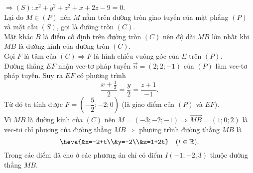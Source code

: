 \begin{ex}
{$\Rightarrow (S)\colon x^2 + y^2 + z^2 + x + 2z - 9 = 0$.\\
Lại do $M \in (P)$ nên $M$ nằm trên đường tròn giao tuyến của mặt phẳng $(P)$ và mặt cầu $(S)$, gọi là đường tròn $(C)$.\\
 Mặt khác $B$ là điểm cố định trên đường tròn $(C)$ nên độ dài $MB$ lớn nhất khi $MB$ là đường kính của đường tròn $(C)$.\\
 Gọi $F$ là tâm của $(C) \Rightarrow F$ là hình chiếu vuông góc của $E$ trên $(P)$.\\
Đường thẳng $EF$ nhận vec-tơ pháp tuyến $\overrightarrow{n} = (2; 2; -1)$ của $(P)$ làm vec-tơ pháp tuyến. Suy ra $EF$ có phương trình
$$ \dfrac{x + \frac{1}{2}}{2} = \dfrac{y}{2} = \dfrac{z + 1}{-1}.$$
Từ đó ta tính được $F = \left( -\dfrac{5}{2}; -2; 0 \right)$ (là giao điểm của $(P)$ và $EF$).\\
 Vì $MB$ là đường kính của $(C)$ nên $M = (-3; -2; -1) \Rightarrow \overrightarrow{MB} = (1; 0; 2)$ là vec-tơ chỉ phương của đường thẳng $MB \Rightarrow$ phương trình đường thẳng $MB$ là 
$$\heva{&x=-2+t\\&y=-2\\&z=1+2t} \quad (t \in \mathbb{R}).$$
 Trong các điểm đã cho ở các phương án chỉ có điểm $I (-1; -2; 3)$  thuộc đường thẳng $MB$.	
}
\end{ex}
